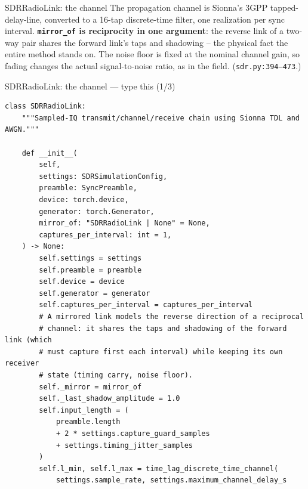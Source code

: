 \documentclass[10pt]{beamer}
\begin{document}
\begin{frame}{SDRRadioLink: the channel}
  The propagation channel is Sionna's 3GPP tapped-delay-line,
  converted to a 16-tap discrete-time filter, one realization
  per sync interval. \textbf{\texttt{mirror\_of} is reciprocity
  in one argument}: the reverse link of a two-way pair shares
  the forward link's taps and shadowing -- the physical fact
  the entire method stands on. The noise floor is fixed at the
  nominal channel gain, so fading changes the actual
  signal-to-noise ratio, as in the field.
  (\texttt{sdr.py:394--473}.)
\end{frame}

\begin{frame}[fragile]{SDRRadioLink: the channel --- type this (1/3)}
\begin{lstlisting}[basicstyle=\ttfamily\tiny]
class SDRRadioLink:
    """Sampled-IQ transmit/channel/receive chain using Sionna TDL and AWGN."""

    def __init__(
        self,
        settings: SDRSimulationConfig,
        preamble: SyncPreamble,
        device: torch.device,
        generator: torch.Generator,
        mirror_of: "SDRRadioLink | None" = None,
        captures_per_interval: int = 1,
    ) -> None:
        self.settings = settings
        self.preamble = preamble
        self.device = device
        self.generator = generator
        self.captures_per_interval = captures_per_interval
        # A mirrored link models the reverse direction of a reciprocal
        # channel: it shares the taps and shadowing of the forward link (which
        # must capture first each interval) while keeping its own receiver
        # state (timing carry, noise floor).
        self._mirror = mirror_of
        self._last_shadow_amplitude = 1.0
        self.input_length = (
            preamble.length
            + 2 * settings.capture_guard_samples
            + settings.timing_jitter_samples
        )
        self.l_min, self.l_max = time_lag_discrete_time_channel(
            settings.sample_rate, settings.maximum_channel_delay_s
\end{lstlisting}
\end{frame}
\end{document}
